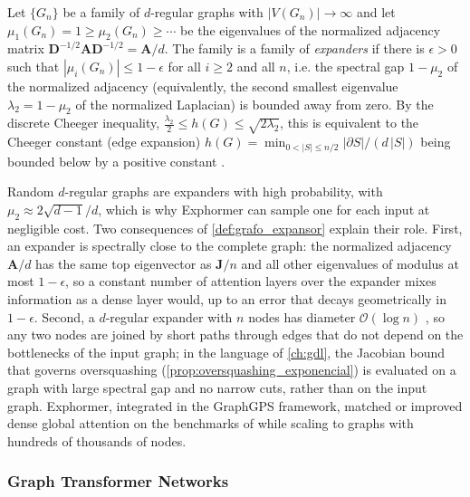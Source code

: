 \begin{definition}\label{def:grafo_expansor}
Let $\{G_n\}$ be a family of $d$-regular graphs with $|V(G_n)| \to \infty$ and let $\mu_1(G_n) = 1 \geq \mu_2(G_n) \geq \cdots$ be the eigenvalues of the normalized adjacency matrix $\mathbf{D}^{-1/2}\mathbf{A}\mathbf{D}^{-1/2} = \mathbf{A}/d$. The family is a family of \emph{expanders} if there is $\epsilon > 0$ such that $|\mu_i(G_n)| \leq 1 - \epsilon$ for all $i \geq 2$ and all $n$, i.e. the spectral gap $1 - \mu_2$ of the normalized adjacency (equivalently, the second smallest eigenvalue $\lambda_2 = 1 - \mu_2$ of the normalized Laplacian) is bounded away from zero. By the discrete Cheeger inequality, $\tfrac{\lambda_2}{2} \leq h(G) \leq \sqrt{2\lambda_2}$, this is equivalent to the Cheeger constant (edge expansion) $h(G) = \min_{0 < |S| \leq n/2} |\partial S| / (d\,|S|)$ being bounded below by a positive constant \citep{hoory2006expander}.
\end{definition}

Random $d$-regular graphs are expanders with high probability, with $\mu_2 \approx 2\sqrt{d-1}/d$, which is why Exphormer can sample one for each input at negligible cost. Two consequences of \autoref{def:grafo_expansor} explain their role. First, an expander is spectrally close to the complete graph: the normalized adjacency $\mathbf{A}/d$ has the same top eigenvector as $\mathbf{J}/n$ and all other eigenvalues of modulus at most $1 - \epsilon$, so a constant number of attention layers over the expander mixes information as a dense layer would, up to an error that decays geometrically in $1 - \epsilon$. Second, a $d$-regular expander with $n$ nodes has diameter $\mathcal{O}(\log n)$ \citep{hoory2006expander}, so any two nodes are joined by short paths through edges that do not depend on the bottlenecks of the input graph; in the language of \autoref{ch:gdl}, the Jacobian bound that governs \gls{oversquashing} (\autoref{prop:oversquashing_exponencial}) is evaluated on a graph with large spectral gap and no narrow cuts, rather than on the input graph. Exphormer, integrated in the GraphGPS framework, matched or improved dense global attention on the benchmarks of \citet{rampasek2022graphgps} while scaling to graphs with hundreds of thousands of nodes.

\subsubsection{Graph \gls{Transformer} Networks}\label{subsubsec:graph_transformers}

